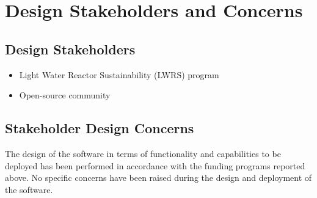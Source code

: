 \section{Design Stakeholders and Concerns}
\subsection{Design Stakeholders}
\begin{itemize}
  \item Light Water Reactor Sustainability (LWRS) program 
  \item Open-source community 
\end{itemize}
\subsection{Stakeholder Design Concerns}
The design of the software in terms of functionality and capabilities to be deployed has been performed in 
accordance with the funding programs reported above. No specific concerns have been raised during the design and 
deployment of the software. 
